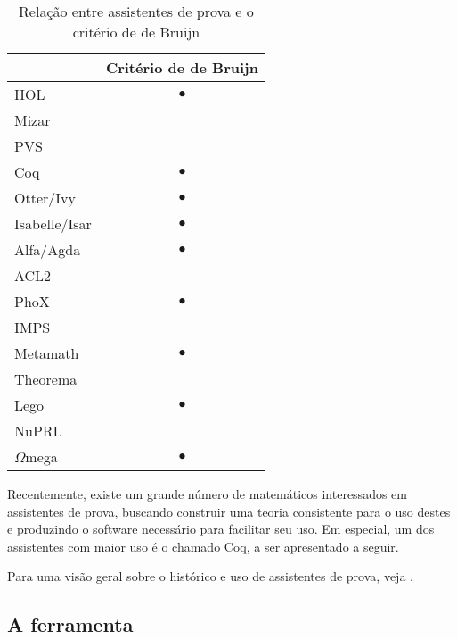 \begin{table}[h]
\centering
\caption{Relação entre assistentes de prova e o critério de de Bruijn \cite{freek}}
\label{table:dbj_crit}
\begin{tabular}{l|c}
              & \multicolumn{1}{l}{Critério de de Bruijn} \\ \hline
HOL           & $\bullet$                                 \\
Mizar         & \multicolumn{1}{l}{}                      \\
PVS           & \multicolumn{1}{l}{}                      \\ 
Coq           & $\bullet$                                 \\
Otter/Ivy     & $\bullet$                                 \\
Isabelle/Isar & $\bullet$                                 \\
Alfa/Agda     & $\bullet$                                 \\
ACL2          &                                           \\
PhoX          & $\bullet$                                 \\
IMPS          &                                           \\
Metamath      & $\bullet$                                 \\
Theorema      &                                           \\
Lego          & $\bullet$                                 \\
NuPRL         &                                           \\
$\Omega$mega  & $\bullet$                                        
\end{tabular}
\end{table}


Recentemente, existe um grande número de matemáticos interessados em assistentes
de prova, buscando construir uma teoria consistente para o uso destes e
produzindo o software necessário para facilitar seu uso. Em especial, um dos
assistentes com maior uso é o chamado Coq, a ser apresentado a seguir.

Para uma visão geral sobre o histórico e uso de assistentes de prova, veja
\cite{proof_assist}. 

\subsection{A ferramenta}

